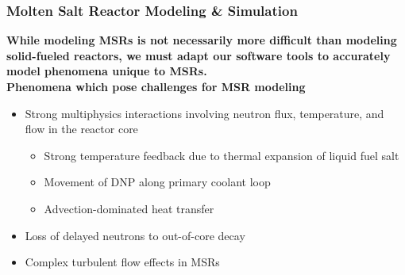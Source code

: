 \begin{frame}
  \frametitle{Molten Salt Reactor Modeling \& Simulation}
  \textbf{While modeling MSRs is not necessarily more difficult than modeling solid-fueled
  reactors, we must adapt our software tools to accurately model phenomena unique to MSRs.}\\

  \textbf{Phenomena which pose challenges for MSR modeling}
  \begin{itemize}
	\item Strong multiphysics interactions involving neutron flux, temperature, and flow in the
      reactor core
	  \begin{itemize}
		\item Strong temperature feedback due to thermal expansion of liquid fuel salt
		\item Movement of \gls{DNP} along primary coolant loop
        \item Advection-dominated heat transfer
	  \end{itemize}
    \item Loss of delayed neutrons to out-of-core decay
    \item Complex turbulent flow effects in MSRs
  \end{itemize}
\end{frame}


